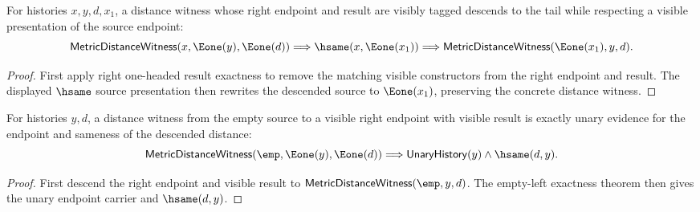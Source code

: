 

\begin{theorem}
\label{thm:metric-distance-witness-right-e1-visible-source-exactness}
For histories $x,y,d,x_1$, a distance witness whose right endpoint and result
are visibly tagged descends to the tail while respecting a visible presentation
of the source endpoint:
$$
\mathsf{MetricDistanceWitness}(x,\Eone(y),\Eone(d))
\Longrightarrow
\hsame(x,\Eone(x_1))
\Longrightarrow
\mathsf{MetricDistanceWitness}(\Eone(x_1),y,d).
$$
\end{theorem}
\begin{proof}
First apply right one-headed result exactness to remove the matching visible
constructors from the right endpoint and result. The displayed $\hsame$ source
presentation then rewrites the descended source to $\Eone(x_1)$, preserving the
concrete distance witness.
\end{proof}

\begin{theorem}
\label{thm:metric-distance-witness-right-e1-empty-source-exactness}
For histories $y,d$, a distance witness from the empty source to a visible
right endpoint with visible result is exactly unary evidence for the endpoint
and sameness of the descended distance:
$$
\mathsf{MetricDistanceWitness}(\emp,\Eone(y),\Eone(d))
\Longrightarrow
\mathsf{UnaryHistory}(y)\land\hsame(d,y).
$$
\end{theorem}
\begin{proof}
First descend the right endpoint and visible result to
$\mathsf{MetricDistanceWitness}(\emp,y,d)$. The empty-left exactness theorem
then gives the unary endpoint carrier and $\hsame(d,y)$.
\end{proof}

